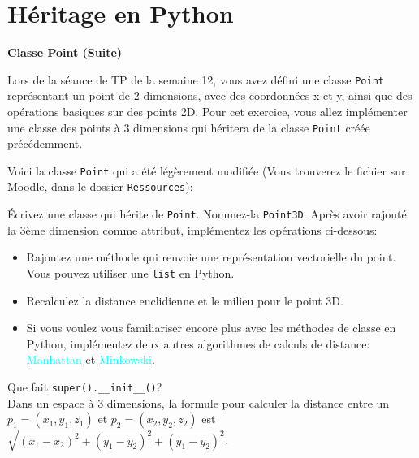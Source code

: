 \section{Héritage en Python }
\begin{Exercice}[15 minutes]\textbf{Classe Point (Suite)}

Lors de la séance de TP de la semaine 12, vous avez défini une classe \lstinline{Point} représentant un point de 2 dimensions, avec des coordonnées x et y, ainsi que des opérations basiques sur des points 2D. Pour cet exercice, vous allez implémenter une classe des points à 3 dimensions qui héritera de la classe \lstinline{Point} créée précédemment. 


Voici la classe \lstinline{Point} qui a été légèrement modifiée (Vous trouverez le fichier sur Moodle, dans le dossier \lstinline{Ressources}):
 

Écrivez une classe qui hérite de \lstinline{Point}. Nommez-la \lstinline{Point3D}. Après avoir rajouté la 3ème dimension comme attribut, implémentez les opérations ci-dessous:

\begin{itemize}
	\item Rajoutez une méthode qui renvoie une représentation vectorielle du point. Vous pouvez utiliser une \lstinline{list} en Python.
	\item Recalculez la distance euclidienne et le milieu pour le point 3D.
	\item \advanced Si vous voulez vous familiariser encore plus avec les méthodes de classe en Python, implémentez deux autres algorithmes de calculs de distance: \href{https://fr.wikipedia.org/wiki/Distance_de_Manhattan}{\textcolor{cyan}{Manhattan}} et \href{https://en.wikipedia.org/wiki/Minkowski_distance}{\textcolor{cyan}{Minkowski}}.
\end{itemize}
 

\begin{conseil}

Que fait \lstinline{super().__init__()}?\\
Dans un espace à 3 dimensions, la formule pour calculer la distance entre un $p_1 = (x_1, y_1, z_1)$ et $p_2 = (x_2, y_2, z_2)$ est $\sqrt{(x_1 - x_2)^2 + (y_1 - y_2)^2 + (y_1 - y_2)^2}$.
\end{conseil}
\begin{solution}
 
\end{solution}
\end{Exercice} 


